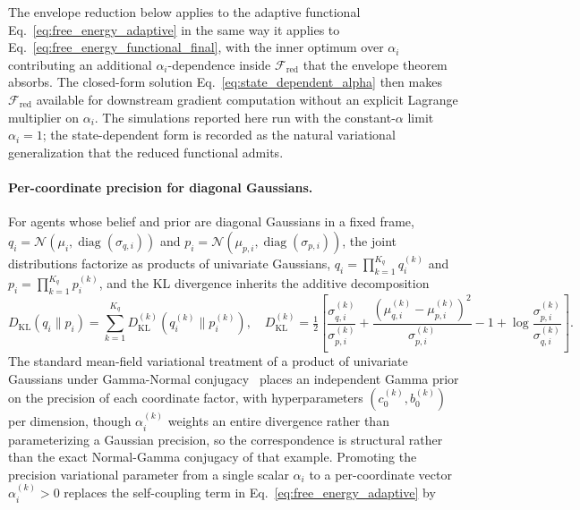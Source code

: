 \documentclass[11pt]{article}
\begin{document}
The envelope reduction below applies to the adaptive functional Eq.~\eqref{eq:free_energy_adaptive} in the same way it applies to Eq.~\eqref{eq:free_energy_functional_final}, with the inner optimum over $\alpha_i$ contributing an additional $\alpha_i$-dependence inside $\mathcal{F}_{\mathrm{red}}$ that the envelope theorem absorbs. The closed-form solution Eq.~\eqref{eq:state_dependent_alpha} then makes $\mathcal{F}_{\mathrm{red}}$ available for downstream gradient computation without an explicit Lagrange multiplier on $\alpha_i$. The simulations reported here run with the constant-$\alpha$ limit $\alpha_i = 1$; the state-dependent form is recorded as the natural variational generalization that the reduced functional admits.

\paragraph{Per-coordinate precision for diagonal Gaussians.}
\label{par:per_coord_alpha}
For agents whose belief and prior are diagonal Gaussians in a fixed frame, $q_i = \mathcal{N}(\mu_i, \operatorname{diag}(\sigma_{q,i}))$ and $p_i = \mathcal{N}(\mu_{p,i}, \operatorname{diag}(\sigma_{p,i}))$, the joint distributions factorize as products of univariate Gaussians, $q_i = \prod_{k=1}^{K_q} q_i^{(k)}$ and $p_i = \prod_{k=1}^{K_q} p_i^{(k)}$, and the KL divergence inherits the additive decomposition
\begin{equation}
D_{\mathrm{KL}}(q_i \| p_i) = \sum_{k=1}^{K_q} D_{\mathrm{KL}}^{(k)}(q_i^{(k)} \| p_i^{(k)}),
\quad
D_{\mathrm{KL}}^{(k)} = \tfrac{1}{2}\left[ \frac{\sigma_{q,i}^{(k)}}{\sigma_{p,i}^{(k)}} + \frac{(\mu_{q,i}^{(k)} - \mu_{p,i}^{(k)})^2}{\sigma_{p,i}^{(k)}} - 1 + \log \frac{\sigma_{p,i}^{(k)}}{\sigma_{q,i}^{(k)}} \right].
\label{eq:kl_decomposition_per_coord}
\end{equation}
The standard mean-field variational treatment of a product of univariate Gaussians under Gamma-Normal conjugacy~\cite[\S 10.1.3, \S 2.3.6]{Bishop2006} places an independent Gamma prior on the precision of each coordinate factor, with hyperparameters $(c_0^{(k)}, b_0^{(k)})$ per dimension, though $\alpha_i^{(k)}$ weights an entire divergence rather than parameterizing a Gaussian precision, so the correspondence is structural rather than the exact Normal-Gamma conjugacy of that example. Promoting the precision variational parameter from a single scalar $\alpha_i$ to a per-coordinate vector $\alpha_i^{(k)} > 0$ replaces the self-coupling term in Eq.~\eqref{eq:free_energy_adaptive} by
\end{document}
